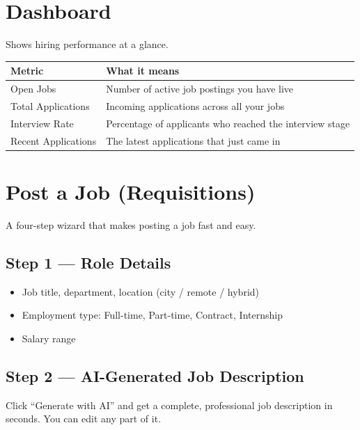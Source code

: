 \documentclass[12pt, a4paper]{report}
\begin{document}
\section{Dashboard}

Shows hiring performance at a glance.

\begin{center}
\begin{tabularx}{\textwidth}{lX}
\toprule
\textbf{Metric} & \textbf{What it means} \\
\midrule
Open Jobs           & Number of active job postings you have live \\
Total Applications  & Incoming applications across all your jobs \\
Interview Rate      & Percentage of applicants who reached the interview stage \\
Recent Applications & The latest applications that just came in \\
\bottomrule
\end{tabularx}
\end{center}

\section{Post a Job (Requisitions)}

A four-step wizard that makes posting a job fast and easy.

\subsection{Step 1 --- Role Details}
\begin{itemize}
  \item Job title, department, location (city / remote / hybrid)
  \item Employment type: Full-time, Part-time, Contract, Internship
  \item Salary range
\end{itemize}

\subsection{Step 2 --- AI-Generated Job Description}
Click ``Generate with AI'' and get a complete, professional job description in
seconds.  You can edit any part of it.
\end{document}
